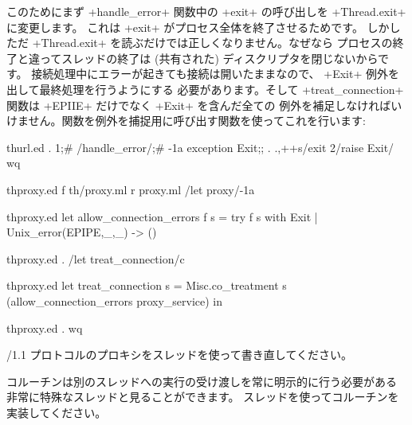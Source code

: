 このためにまず \ml+handle_error+ 関数中の \ml+exit+ の呼び出しを \ml+Thread.exit+ に変更します。
これは \ml+exit+ がプロセス全体を終了させるためです。
しかしただ \ml+Thread.exit+ を読ぶだけでは正しくなりません。なぜなら
プロセスの終了と違ってスレッドの終了は (共有された) ディスクリプタを閉じないからです。
接続処理中にエラーが起きても接続は開いたままなので、 \ml+Exit+ 例外を出して最終処理を行うようにする
必要があります。そして \ml+treat_connection+ 関数は \ml+EPIIE+ だけでなく \ml+Exit+ を含んだ全ての
例外を補足しなければいけません。関数を例外を捕捉用に呼び出す関数を使ってこれを行います:
%
\begin{codefile}{thurl.ed}
.
1;#
/handle_error/;#
-1a
exception Exit;;
.
.,++s/exit 2/raise Exit/
wq
\end{codefile}
%
\begin{codefile}{thproxy.ed}
f th/proxy.ml
r proxy.ml
/let proxy/-1a
\end{codefile}
\begin{listingcodefile}{thproxy.ed}
let allow_connection_errors f s =
  try f s with Exit | Unix_error(EPIPE,_,_) -> ()
\end{listingcodefile}
%
\begin{codefile}{thproxy.ed}
.
/let treat_connection/c
\end{codefile}
%
\begin{listingcodefile}{thproxy.ed}
let treat_connection s =
  Misc.co_treatment s (allow_connection_errors proxy_service) in
\end{listingcodefile}
%
\begin{codefile}{thproxy.ed}
.
wq
\end{codefile}

\begin{exercise}[noanswer]
\http/1.1 プロトコルのプロキシをスレッドを使って書き直してください。
\end{exercise}

\begin{exercise}[noanswer]
コルーチンは別のスレッドへの実行の受け渡しを常に明示的に行う必要がある
非常に特殊なスレッドと見ることができます。
スレッドを使ってコルーチンを実装してください。
\end{exercise}

